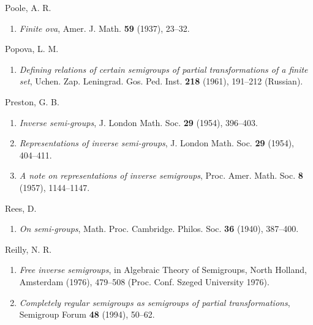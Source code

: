 \documentclass{surv-l}
\numberwithin{equation}{section}
\numberwithin{table}{section}
\numberwithin{figure}{section}
\theoremstyle{plain}
\theoremstyle{definition}
\begin{document}
\begin{thebibliography}{}
\item[] Poole, A. R.
\begin{enumerate}
\item \label{bib61} \emph{Finite ova}, Amer. J. Math. \textbf{59} (1937), 23--32.
\end{enumerate}

\item[] Popova, L. M.
\begin{enumerate}
\item \label{bib62} \emph{Defining relations of certain semigroups of
partial transformations of a finite set}, Uchen. Zap.
Leningrad. Gos. Ped. Inst. \textbf{218} (1961), 191--212
(Russian).
\end{enumerate}

\item[] Preston, G. B.
\begin{enumerate}
\item \label{bib63} \emph{Inverse semi-groups}, J. London Math. Soc. \textbf{29}
(1954), 396--403.

\item \label{bib63a} \emph{Representations of inverse semi-groups}, J.
London Math. Soc. \textbf{29} (1954), 404--411.

\item \label{bib63b} \emph{A note on representations of inverse
semigroups}, Proc. Amer. Math. Soc. \textbf{8} (1957),
1144--1147.
\end{enumerate}

\item[] Rees, D.
\begin{enumerate}
\item \label{bib23} \emph{On semi-groups}, Math. Proc. Cambridge. Philos.
Soc. \textbf{36} (1940), 387--400.
\end{enumerate}

\item[] Reilly, N. R.
\begin{enumerate}
\item \label{bib64} \emph{Free inverse semigroups}, in Algebraic Theory of
Semigroups, North Holland, Amsterdam (1976), 479--508
(Proc. Conf. Szeged University 1976).

\item \label{bib64a} \emph{Completely regular semigroups as semigroups of
partial transformations}, Semigroup Forum \textbf{48}
(1994), 50--62.
\end{enumerate}


\end{thebibliography}
\end{document}
